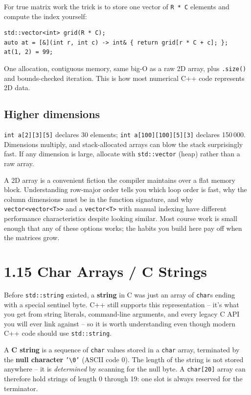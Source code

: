\documentclass[11pt]{article}
\begin{document}
\begin{ideabox}
For true matrix work the trick is to store one vector of
\texttt{R * C} elements and compute the index yourself:
\begin{verbatim}
std::vector<int> grid(R * C);
auto at = [&](int r, int c) -> int& { return grid[r * C + c]; };
at(1, 2) = 99;
\end{verbatim}
One allocation, contiguous memory, same big-O as a raw 2D array, plus
\texttt{.size()} and bounds-checked iteration. This is how most
numerical C++ code represents 2D data.
\end{ideabox}

\subsection{Higher dimensions}

\texttt{int a[2][3][5]} declares 30 elements; \texttt{int a[100][100][5][3]}
declares 150\,000. Dimensions multiply, and stack-allocated arrays can
blow the stack surprisingly fast. If any dimension is large, allocate
with \texttt{std::vector} (heap) rather than a raw array.

\begin{ideabox}
A 2D array is a convenient fiction the compiler maintains over a flat
memory block. Understanding row-major order tells you which loop order
is fast, why the column dimensions must be in the function signature,
and why \texttt{vector<vector<T>>} and a \texttt{vector<T>} with manual
indexing have different performance characteristics despite looking
similar. Most course work is small enough that any of these options
works; the habits you build here pay off when the matrices grow.
\end{ideabox}

\section{1.15 Char Arrays / C Strings}

Before \texttt{std::string} existed, a \textbf{string} in C was just an
array of \texttt{char}s ending with a special sentinel byte. C++ still
supports this representation -- it's what you get from string literals,
command-line arguments, and every legacy C API you will ever link
against -- so it is worth understanding even though modern C++ code
should use \texttt{std::string}.

\begin{defnbox}
A \textbf{C string} is a sequence of \texttt{char} values stored in a
\texttt{char} array, terminated by the \textbf{null character}
\texttt{'\textbackslash0'} (ASCII code 0). The length of the string is
not stored anywhere -- it is \emph{determined} by scanning for the null
byte. A \texttt{char[20]} array can therefore hold strings of length 0
through 19: one slot is always reserved for the terminator.
\end{defnbox}
\end{document}
